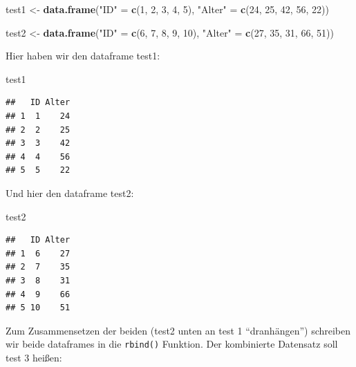 \documentclass[
]{book}
\newenvironment{Shaded}{\begin{snugshade}}{\end{snugshade}}
\newcommand{\DecValTok}[1]{\textcolor[rgb]{0.00,0.00,0.81}{#1}}
\newcommand{\FunctionTok}[1]{\textcolor[rgb]{0.13,0.29,0.53}{\textbf{#1}}}
\newcommand{\NormalTok}[1]{#1}
\newcommand{\OtherTok}[1]{\textcolor[rgb]{0.56,0.35,0.01}{#1}}
\newcommand{\StringTok}[1]{\textcolor[rgb]{0.31,0.60,0.02}{#1}}
\begin{document}
\begin{Shaded}
\begin{Highlighting}[]
\NormalTok{test1 }\OtherTok{\textless{}{-}} \FunctionTok{data.frame}\NormalTok{(}\StringTok{"ID"} \OtherTok{=} \FunctionTok{c}\NormalTok{(}\DecValTok{1}\NormalTok{, }\DecValTok{2}\NormalTok{, }\DecValTok{3}\NormalTok{, }\DecValTok{4}\NormalTok{, }\DecValTok{5}\NormalTok{),}
                     \StringTok{"Alter"} \OtherTok{=} \FunctionTok{c}\NormalTok{(}\DecValTok{24}\NormalTok{, }\DecValTok{25}\NormalTok{, }\DecValTok{42}\NormalTok{, }\DecValTok{56}\NormalTok{, }\DecValTok{22}\NormalTok{))}

\NormalTok{test2 }\OtherTok{\textless{}{-}} \FunctionTok{data.frame}\NormalTok{(}\StringTok{"ID"} \OtherTok{=} \FunctionTok{c}\NormalTok{(}\DecValTok{6}\NormalTok{, }\DecValTok{7}\NormalTok{, }\DecValTok{8}\NormalTok{, }\DecValTok{9}\NormalTok{, }\DecValTok{10}\NormalTok{),}
                     \StringTok{"Alter"} \OtherTok{=} \FunctionTok{c}\NormalTok{(}\DecValTok{27}\NormalTok{, }\DecValTok{35}\NormalTok{, }\DecValTok{31}\NormalTok{, }\DecValTok{66}\NormalTok{, }\DecValTok{51}\NormalTok{))}
\end{Highlighting}
\end{Shaded}

Hier haben wir den dataframe test1:

\begin{Shaded}
\begin{Highlighting}[]
\NormalTok{test1}
\end{Highlighting}
\end{Shaded}

\begin{verbatim}
##   ID Alter
## 1  1    24
## 2  2    25
## 3  3    42
## 4  4    56
## 5  5    22
\end{verbatim}

Und hier den dataframe test2:

\begin{Shaded}
\begin{Highlighting}[]
\NormalTok{test2}
\end{Highlighting}
\end{Shaded}

\begin{verbatim}
##   ID Alter
## 1  6    27
## 2  7    35
## 3  8    31
## 4  9    66
## 5 10    51
\end{verbatim}

Zum Zusammensetzen der beiden (test2 unten an test 1 ``dranhängen'') schreiben wir beide dataframes in die \texttt{rbind()} Funktion. Der kombinierte Datensatz soll test 3 heißen:
\end{document}
